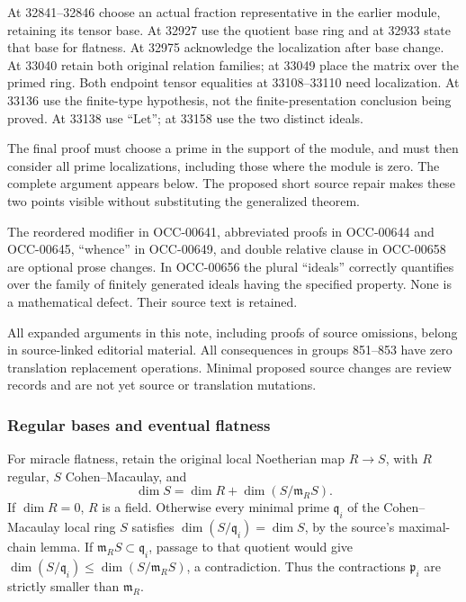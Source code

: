 At 32841--32846 choose an actual fraction representative in the earlier module, retaining its tensor base. At 32927 use the quotient base ring and at 32933 state that base for flatness. At 32975 acknowledge the localization after base change. At 33040 retain both original relation families; at 33049 place the matrix over the primed ring. Both endpoint tensor equalities at 33108--33110 need localization. At 33136 use the finite-type hypothesis, not the finite-presentation conclusion being proved. At 33138 use ``Let''; at 33158 use the two distinct ideals.

The final proof must choose a prime in the support of the module, and must then consider all prime localizations, including those where the module is zero. The complete argument appears below. The proposed short source repair makes these two points visible without substituting the generalized theorem.

The reordered modifier in OCC-00641, abbreviated proofs in OCC-00644 and OCC-00645, ``whence'' in OCC-00649, and double relative clause in OCC-00658 are optional prose changes. In OCC-00656 the plural ``ideals'' correctly quantifies over the family of finitely generated ideals having the specified property. None is a mathematical defect. Their source text is retained.

All expanded arguments in this note, including proofs of source omissions, belong in source-linked editorial material. All consequences in groups 851--853 have zero translation replacement operations. Minimal proposed source changes are review records and are not yet source or translation mutations.

\subsubsection{Regular bases and eventual flatness}\label{algebra-proof-038-regular-bases-and-eventual-flatness}

For miracle flatness, retain the original local Noetherian map \(R\to S\), with \(R\) regular, \(S\) Cohen--Macaulay, and \[
\dim S=\dim R+\dim(S/\mathfrak m_RS).
\] If \(\dim R=0\), \(R\) is a field. Otherwise every minimal prime \(\mathfrak q_i\) of the Cohen--Macaulay local ring \(S\) satisfies \(\dim(S/\mathfrak q_i)=\dim S\), by the source's maximal-chain lemma. If \(\mathfrak m_RS\subset\mathfrak q_i\), passage to that quotient would give \(\dim(S/\mathfrak q_i)\leq\dim(S/\mathfrak m_RS)\), a contradiction. Thus the contractions \(\mathfrak p_i\) are strictly smaller than \(\mathfrak m_R\).

